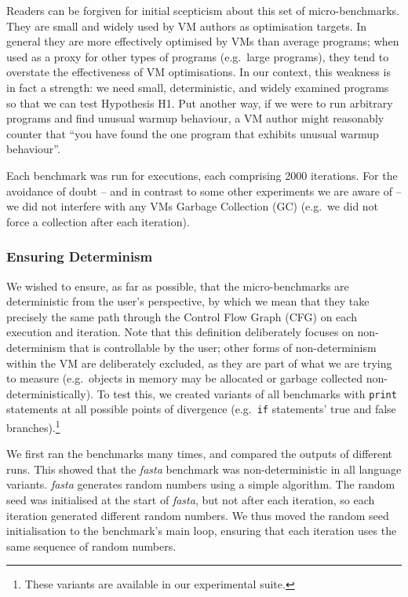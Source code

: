 \documentclass[10pt,preprint]{sigplanconf}
\newcommand{\hypone}{H1\xspace}
\newcommand{\fasta}{\emph{fasta}\xspace}
\begin{document}
Readers can be forgiven for initial scepticism about this set of micro-benchmarks.
They are small and widely
used by VM authors as optimisation targets. In general they are more effectively
optimised by VMs than average programs; when used as a proxy for other types
of programs (e.g.~large programs), they tend to overstate the effectiveness of
VM optimisations. In our context, this weakness is in fact a strength: we need
small, deterministic, and widely examined programs so that we can test
Hypothesis \hypone. Put another way, if we were to run arbitrary programs
and find unusual warmup behaviour, a VM author might reasonably counter that
``you have found the one program that exhibits unusual warmup behaviour''.

Each benchmark was run for  executions, each comprising 2000
iterations. For the avoidance of doubt -- and in
contrast to some other experiments we are aware of  -- we 
did not interfere with any VMs Garbage Collection (GC) (e.g.~we did not
force a collection after each iteration).


\subsubsection{Ensuring Determinism}

We wished to ensure, as far as possible, that the micro-benchmarks are
deterministic from the user's perspective, by which we mean that they
take precisely the same path through the Control Flow Graph (CFG) on each
execution and iteration. Note that this definition deliberately focuses
on non-determinism that is controllable by the user; other forms of
non-determinism within the VM are deliberately excluded, as they are
part of what we are trying to measure (e.g.~objects in memory may be allocated
or garbage collected non-deterministically). To test this, we created variants
of all benchmarks with \texttt{print} statements at all possible points of
divergence (e.g.~\texttt{if} statements' true and false branches).\footnote{These
variants are available in our experimental suite.}

We first ran the benchmarks many  times, and compared the outputs
of different runs. This showed that the \fasta benchmark was non-deterministic
in all language variants. \fasta generates random numbers using a simple
algorithm. The random seed was initialised at the start of \fasta, but not after
each iteration, so each iteration generated different random numbers. We thus
moved the random seed initialisation to the benchmark's main loop, ensuring that
each iteration uses the same sequence of random numbers.
\end{document}

